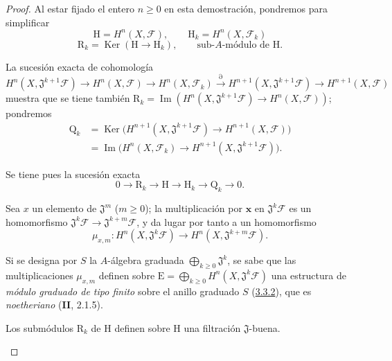 \begin{proof}
Al estar fijado el entero $n\geq0$ en esta demostración, pondremos para
simplificar
\[
\mathrm H=H^n(X,\mathcal F),\qquad
\mathrm H_k=H^n(X,\mathcal F_k)
\tag{4.1.7.3}\label{III.4.1.7.3-fr}
\]
\[
\mathrm R_k=\operatorname{Ker}(\mathrm H\longrightarrow\mathrm H_k),
\qquad\text{sub-$A$-módulo de $\mathrm H$.}
\tag{4.1.7.4}\label{III.4.1.7.4-fr}
\]

La sucesión exacta de cohomología
\[
H^n(X,\mathfrak J^{k+1}\mathcal F)\longrightarrow H^n(X,\mathcal F)
\longrightarrow H^n(X,\mathcal F_k)\xrightarrow{\partial}
H^{n+1}(X,\mathfrak J^{k+1}\mathcal F)
\longrightarrow H^{n+1}(X,\mathcal F)
\]
muestra que se tiene también
$\mathrm R_k=\operatorname{Im}(
H^n(X,\mathfrak J^{k+1}\mathcal F)\longrightarrow H^n(X,\mathcal F)
)$;
pondremos
\[
\begin{aligned}
\mathrm Q_k
&=\operatorname{Ker}\bigl(H^{n+1}(X,\mathfrak J^{k+1}\mathcal F)
\longrightarrow H^{n+1}(X,\mathcal F)\bigr)\\
&=\operatorname{Im}\bigl(H^n(X,\mathcal F_k)
\longrightarrow H^{n+1}(X,\mathfrak J^{k+1}\mathcal F)\bigr).
\end{aligned}
\tag{4.1.7.5}\label{III.4.1.7.5-fr}
\]

Se tiene pues la sucesión exacta
\[
0\longrightarrow\mathrm R_k\longrightarrow\mathrm H
\longrightarrow\mathrm H_k\longrightarrow\mathrm Q_k\longrightarrow0.
\tag{4.1.7.6}\label{III.4.1.7.6-fr}
\]

\begin{env}[4.1.7.7]
\label{III.4.1.7.7-fr}
Sea $x$ un elemento de $\mathfrak J^m$ ($m\geq0$); la multiplicación por
$\boldsymbol{x}$ en $\mathfrak J^k\mathcal F$ es un homomorfismo
$\mathfrak J^k\mathcal F\to\mathfrak J^{k+m}\mathcal F$, y da lugar
por tanto a un homomorfismo
\[
\mu_{x,m}:H^n(X,\mathfrak J^k\mathcal F)
\longrightarrow H^n(X,\mathfrak J^{k+m}\mathcal F).
\tag{4.1.7.8}\label{III.4.1.7.8-fr}
\]

Si se designa por $S$ la $A$-álgebra graduada
$\bigoplus_{k\geq0}\mathfrak J^k$, se sabe que las multiplicaciones
$\mu_{x,m}$ definen sobre
$\mathrm E=\bigoplus_{k\geq0}H^n(X,\mathfrak J^k\mathcal F)$ una
estructura de \emph{módulo graduado de tipo finito} sobre el anillo graduado $S$
(\hyperref[III.3.3.2-fr]{3.3.2}), que es \emph{noetheriano} (\textbf{II}, 2.1.5).
\end{env}

\begin{lemma}[4.1.7.9]
\label{III.4.1.7.9-fr}
Los submódulos $\mathrm R_k$ de $\mathrm H$ definen sobre $\mathrm H$
una filtración $\mathfrak J$-buena.
\end{lemma}


\end{proof}
